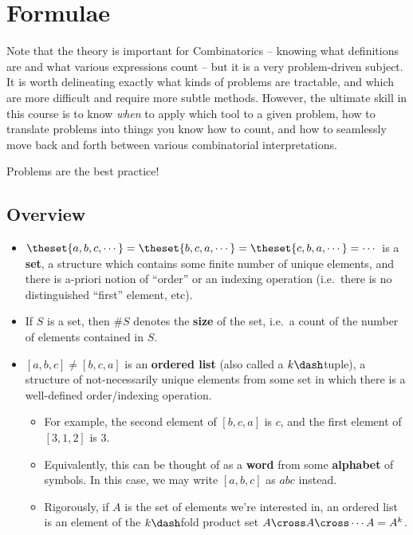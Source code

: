 \maketitle
\tableofcontents


\hypertarget{formulae}{%
\section{Formulae}\label{formulae}}

Note that the theory is important for Combinatorics -- knowing what
definitions are and what various expressions count -- but it is a very
problem-driven subject. It is worth delineating exactly what kinds of
problems are tractable, and which are more difficult and require more
subtle methods. However, the ultimate skill in this course is to know
\emph{when} to apply which tool to a given problem, how to translate
problems into things you know how to count, and how to seamlessly move
back and forth between various combinatorial interpretations.

Problems are the best practice!

\hypertarget{overview}{%
\subsection{Overview}\label{overview}}

\begin{itemize}
\item
  \(\theset{a, b, c, \cdots} = \theset{b, c, a, \cdots} = \theset{c, b, a, \cdots} = \cdots\)
  is a \textbf{set}, a structure which contains some finite number of
  unique elements, and there is a-priori notion of ``order'' or an
  indexing operation (i.e.~there is no distinguished ``first'' element,
  etc).
\item
  If \(S\) is a set, then \(\# S\) denotes the \textbf{size} of the set,
  i.e.~a count of the number of elements contained in \(S\).
\item
  \([a, b, c] \neq [b, c, a]\) is an \textbf{ordered list} (also called
  a \(k\dash\)tuple), a structure of not-necessarily unique elements
  from some set in which there is a well-defined order/indexing
  operation.

  \begin{itemize}
  \tightlist
  \item
    For example, the second element of \([b,c,a]\) is \(c\), and the
    first element of \([3,1,2]\) is 3.
  \item
    Equivalently, this can be thought of as a \textbf{word} from some
    \textbf{alphabet} of symbols. In this case, we may write \([a,b,c]\)
    as \(abc\) instead.
  \item
    Rigorously, if \(A\) is the set of elements we're interested in, an
    ordered list is an element of the \(k\dash\)fold product set
    \(A \cross A \cross \cdots A = A^k\).
  \end{itemize}
\end{itemize}


